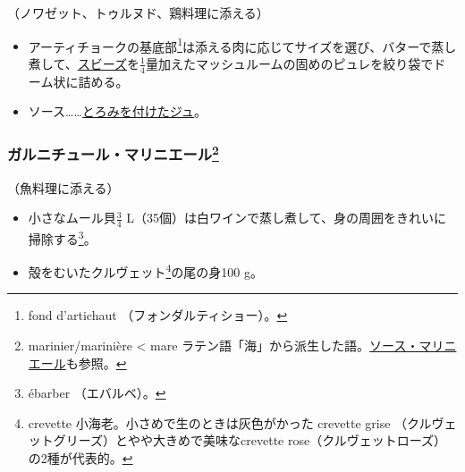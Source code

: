\begin{recette}


（ノワゼット、トゥルヌド、鶏料理に添える）

\begin{itemize}
\item
  アーティチョークの基底部\footnote{fond d'artichaut
    （フォンダルティショー）。}は添える肉に応じてサイズを選び、バターで蒸し煮して、\protect\hyperlink{sauce-soubise}{スビーズ}を\(\frac{1}{4}\)量加えたマッシュルームの固めのピュレを絞り袋でドーム状に詰める。
\item
  ソース\ldots{}\ldots{}\protect\hyperlink{jus-de-veau-lie}{とろみを付けたジュ}。
\end{itemize}

\hypertarget{garniture-marniere}{%
\subsubsection[ガルニチュール・マリニエール]{\texorpdfstring{ガルニチュール・マリニエール\footnote{marinier/marinière
  \textless{} mare
  ラテン語「海」から派生した語。\protect\hyperlink{sauce-mariniere}{ソース・マリニエール}も参照。}}{ガルニチュール・マリニエール}}\label{garniture-marniere}}



（魚料理に添える）

\begin{itemize}
\item
  小さなムール貝\(\frac{3}{4}\)
  L（35個）は白ワインで蒸し煮して、身の周囲をきれいに掃除する\footnote{ébarber
    （エバルベ）。}。
\item
  殻をむいたクルヴェット\footnote{crevette
    小海老。小さめで生のときは灰色がかった crevette grise
    （クルヴェットグリーズ）とやや大きめで美味なcrevette
    rose（クルヴェットローズ）の2種が代表的。}の尾の身100 g。
\end{itemize}


\end{recette}
